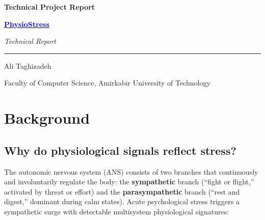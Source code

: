 \documentclass[12pt,a4paper]{article}
\begin{document}
	
	\begin{titlepage}
		\centering
		
		\vspace*{2cm}
		
		{\Huge\bfseries Technical Project Report\par}
		\vspace{0.6cm}
		
		{\LARGE\bfseries 
			\href{https://github.com/alitkbbl/PhysioStress}{\textcolor{blue}{PhysioStress}}
			\par}
		
		\vspace{0.5cm}
		{\large\itshape Technical Report\par}
		
		\vspace{0.8cm}
		\rule{\linewidth}{0.4pt}
		\vspace{0.8cm}
		
		{\Large Ali Taghizadeh\par}
		\vspace{0.3cm}
		
		{\large Faculty of Computer Science, Amirkabir University of Technology\par}
		
		\vfill
		
		\vspace*{1.5cm}
	\end{titlepage}
	
	\tableofcontents
	\newpage
	
	\section{Background}
	
	\subsection{Why do physiological signals reflect stress?}
	
	The autonomic nervous system (ANS) consists of two branches that continuously and involuntarily regulate the body: the \textbf{sympathetic} branch (``fight or flight,'' activated by threat or effort) and the \textbf{parasympathetic} branch (``rest and digest,'' dominant during calm states). Acute psychological stress triggers a sympathetic surge with detectable multisystem physiological signatures:
	
\end{document}
